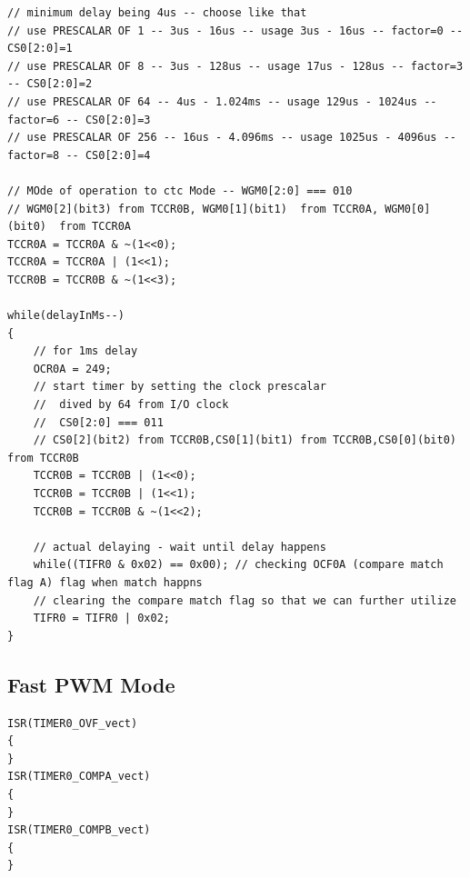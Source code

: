 \documentclass{article}
\begin{document}
\begin{verbatim}
// minimum delay being 4us -- choose like that
// use PRESCALAR OF 1 -- 3us - 16us -- usage 3us - 16us -- factor=0 -- CS0[2:0]=1
// use PRESCALAR OF 8 -- 3us - 128us -- usage 17us - 128us -- factor=3 -- CS0[2:0]=2
// use PRESCALAR OF 64 -- 4us - 1.024ms -- usage 129us - 1024us -- factor=6 -- CS0[2:0]=3
// use PRESCALAR OF 256 -- 16us - 4.096ms -- usage 1025us - 4096us -- factor=8 -- CS0[2:0]=4
    
// MOde of operation to ctc Mode -- WGM0[2:0] === 010
// WGM0[2](bit3) from TCCR0B, WGM0[1](bit1)  from TCCR0A, WGM0[0](bit0)  from TCCR0A
TCCR0A = TCCR0A & ~(1<<0);
TCCR0A = TCCR0A | (1<<1);
TCCR0B = TCCR0B & ~(1<<3);

while(delayInMs--)
{
    // for 1ms delay
    OCR0A = 249;
    // start timer by setting the clock prescalar
    //  dived by 64 from I/O clock
    //  CS0[2:0] === 011
    // CS0[2](bit2) from TCCR0B,CS0[1](bit1) from TCCR0B,CS0[0](bit0) from TCCR0B
    TCCR0B = TCCR0B | (1<<0);
    TCCR0B = TCCR0B | (1<<1);
    TCCR0B = TCCR0B & ~(1<<2);

    // actual delaying - wait until delay happens
    while((TIFR0 & 0x02) == 0x00); // checking OCF0A (compare match flag A) flag when match happns
    // clearing the compare match flag so that we can further utilize
    TIFR0 = TIFR0 | 0x02;
}
\end{verbatim}

\subsection{Fast PWM Mode}
\begin{verbatim}
ISR(TIMER0_OVF_vect)
{
} 
ISR(TIMER0_COMPA_vect)
{
}
ISR(TIMER0_COMPB_vect)
{
}
\end{verbatim}
\end{document}

